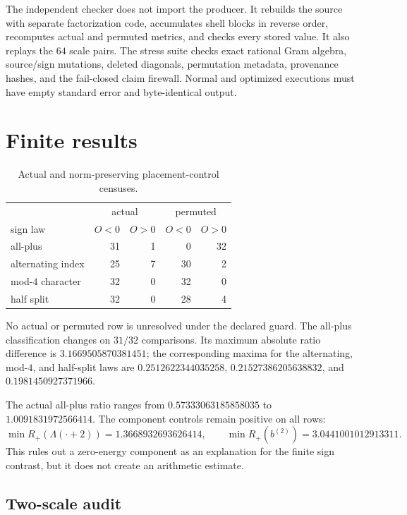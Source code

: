 \documentclass[10pt]{article}
\newcommand{\1}{\mathbf 1}
\begin{document}
The independent checker does not import the producer.  It rebuilds the source
with separate factorization code, accumulates shell blocks in reverse order,
recomputes actual and permuted metrics, and checks every stored value.  It also
replays the $64$ scale pairs.  The stress suite checks exact rational Gram
algebra, source/sign mutations, deleted diagonals, permutation metadata,
provenance hashes, and the fail-closed claim firewall.  Normal and optimized
executions must have empty standard error and byte-identical output.

\section{Finite results}

\begin{table}[ht]
\centering
\caption{Actual and norm-preserving placement-control censuses.}
\label{tab:placement}
\begin{tabular}{lrrrr}
\toprule
 & \multicolumn{2}{c}{actual} & \multicolumn{2}{c}{permuted}\\
sign law & $O<0$ & $O>0$ & $O<0$ & $O>0$\\
\midrule
all-plus & 31 & 1 & 0 & 32\\
alternating index & 25 & 7 & 30 & 2\\
mod-$4$ character & 32 & 0 & 32 & 0\\
half split & 32 & 0 & 28 & 4\\
\bottomrule
\end{tabular}
\end{table}

No actual or permuted row is unresolved under the declared guard.  The
all-plus classification changes on $31/32$ comparisons.  Its maximum absolute
ratio difference is $3.1669505870381451$; the corresponding maxima for the
alternating, mod-$4$, and half-split laws are
$0.2512622344035258$, $0.21527386205638832$, and
$0.1981450927371966$.

The actual all-plus ratio ranges from $0.57333063185858035$ to
$1.0091831972566414$.  The component controls remain positive on all rows:
\[
 \min R_+(\Lambda(\cdot+2))=1.3668932693626414,\qquad
 \min R_+(b^{(2)})=3.0441001012913311.
\]
This rules out a zero-energy component as an explanation for the finite sign
contrast, but it does not create an arithmetic estimate.

\subsection{Two-scale audit}
\end{document}
